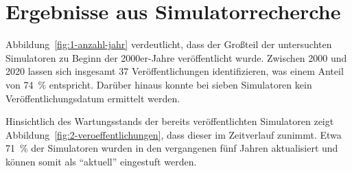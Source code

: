 \section{Ergebnisse aus Simulatorrecherche}

Abbildung~\ref{fig:1-anzahl-jahr} verdeutlicht, dass der Großteil der untersuchten Simulatoren zu Beginn der 2000er-Jahre veröffentlicht wurde. Zwischen 2000 und 2020 lassen sich insgesamt 37 Veröffentlichungen identifizieren, was einem Anteil von 74~\% entspricht. Darüber hinaus konnte bei sieben Simulatoren kein Veröffentlichungsdatum ermittelt werden.

Hinsichtlich des Wartungsstands der bereits veröffentlichten Simulatoren zeigt Abbildung~\ref{fig:2-veroeffentlichungen}, dass dieser im Zeitverlauf zunimmt. Etwa 71~\% der Simulatoren wurden in den vergangenen fünf Jahren aktualisiert und können somit als \enquote{aktuell} eingestuft werden.

